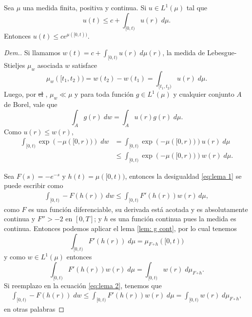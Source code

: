 \begin{lem}\label{Lema gronwall}
	Sea $\mu$ una medida finita, positiva y continua. Si $u\in L^1(\mu) $ tal que 
	\begin{equation*}
		u(t)\leq c+\int_{[0,t)}u(r) \; d\mu.
	\end{equation*}
Entonces $u(t)\leq ce^{\mu([0,t))}$.
\end{lem}


\begin{proof}[Dem.]
	Si llamamos $w(t)= c+\displaystyle\int_{[0,t)}u(r) \; d\mu(r)$,   la medida de Lebesgue-Stieljes $\mu_{w}$ asociada $w$ satisface
	$$\mu_{w}([t_1,t_2))=w(t_2)-w(t_1)=\int_{[t_1,t_2)}u(r)\; d\mu.$$
 Luego, por \st{el}  \cite[Teorema 3.5]{folland},  $\mu_w\ll \mu$ y para toda función $g\in L^1(\mu)$ y cualquier conjunto $A$ de Borel, vale que 
$$\displaystyle\int_Ag(r)\; dw=\int_Au(r)g(r)\; d\mu.$$
	Como $u(r)\leq w(r)$, 
	\begin{equation}
	\begin{split}
  \int_{[0,t)}\exp\left( -\mu([0,r))\right)\; dw &= \int_{[0,t)}\exp\left( -\mu([0,r))\right)u(r)\; d\mu\\
  &\leq \int_{[0,t)}\exp\left( -\mu([0,r))\right)w(r)\; d\mu.
\label{eq:lema 1}
	\end{split}	\end{equation}


	
 Sea $F(s)=-e^{-s}$ y $h(t)=\mu([0,t))$, entonces la desigualdad \eqref{eq:lema 1} se puede escribir como 
 \begin{equation}
     \begin{split}
         \int_{[0,t)}-F(h(r))\, dw\leq \int_{[0,t)}F'(h(r))w(r)\, d\mu, \label{eq:lema 2}
     \end{split}
 \end{equation}
 como $F$ es una función diferenciable, su derivada está acotada y es absolutamente continua y $F''>-2$ en $[0,T]$; y $h$ es una función continua pues la medida es continua. Entonces podemos aplicar el lema \ref{lem: g cont}, por lo cual tenemos 
 \begin{equation*}
 	\int_{[0,t)} F'(h(r)) \; d\mu= \mu_{F\circ h}([0,t))
 \end{equation*} 
y como $w\in L^1(\mu)$ entonces
\begin{equation*}
	  \int_{[0,t)} F'(h(r)) w(r)\; d\mu= \int_{[0,t)}w(r)\; d\mu_{F\circ h}.
\end{equation*}
Si reemplazo en la ecuación \eqref{eq:lema 2}, tenemos que
\begin{equation*}
    \begin{split}
	\int_{[0,t)}-F\left( h(r)\right)\; dw \leq \int_{[0,t)}F'\left( h(r)\right)w(r)\; d\mu
	= 	\int_{[0,t)}w(r)\; d\mu_{F\circ h},
 \end{split}
\end{equation*}
en otras palabras


\end{proof}
